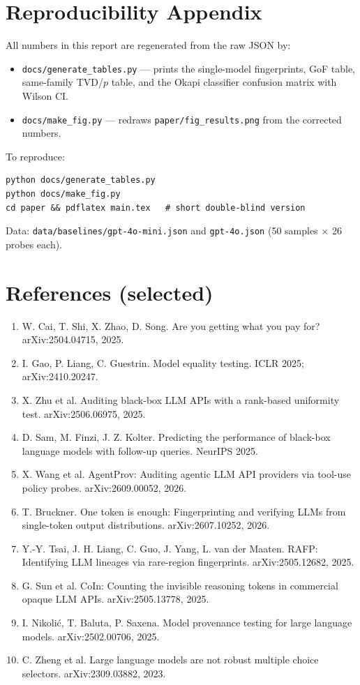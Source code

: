 \documentclass[11pt]{article}
\begin{document}
\section{Reproducibility Appendix}
\label{sec:repro}
All numbers in this report are regenerated from the raw JSON by:
\begin{itemize}
\item \texttt{docs/generate\_tables.py} --- prints the single-model fingerprints, GoF table, same-family TVD/$p$ table, and the Okapi classifier confusion matrix with Wilson CI.
\item \texttt{docs/make\_fig.py} --- redraws \texttt{paper/fig\_results.png} from the corrected numbers.
\end{itemize}
To reproduce:
\begin{verbatim}
python docs/generate_tables.py
python docs/make_fig.py
cd paper && pdflatex main.tex   # short double-blind version
\end{verbatim}
Data: \texttt{data/baselines/gpt-4o-mini.json} and \texttt{gpt-4o.json} (50 samples $\times$ 26 probes each).

\section*{References (selected)}
\small
\begin{enumerate}
\item W. Cai, T. Shi, X. Zhao, D. Song. Are you getting what you pay for? arXiv:2504.04715, 2025.
\item I. Gao, P. Liang, C. Guestrin. Model equality testing. ICLR 2025; arXiv:2410.20247.
\item X. Zhu et al. Auditing black-box LLM APIs with a rank-based uniformity test. arXiv:2506.06975, 2025.
\item D. Sam, M. Finzi, J. Z. Kolter. Predicting the performance of black-box language models with follow-up queries. NeurIPS 2025.
\item X. Wang et al. AgentProv: Auditing agentic LLM API providers via tool-use policy probes. arXiv:2609.00052, 2026.
\item T. Bruckner. One token is enough: Fingerprinting and verifying LLMs from single-token output distributions. arXiv:2607.10252, 2026.
\item Y.-Y. Tsai, J. H. Liang, C. Guo, J. Yang, L. van der Maaten. RAFP: Identifying LLM lineages via rare-region fingerprints. arXiv:2505.12682, 2025.
\item G. Sun et al. CoIn: Counting the invisible reasoning tokens in commercial opaque LLM APIs. arXiv:2505.13778, 2025.
\item I. Nikoli\'c, T. Baluta, P. Saxena. Model provenance testing for large language models. arXiv:2502.00706, 2025.
\item C. Zheng et al. Large language models are not robust multiple choice selectors. arXiv:2309.03882, 2023.
\end{enumerate}
\end{document}
